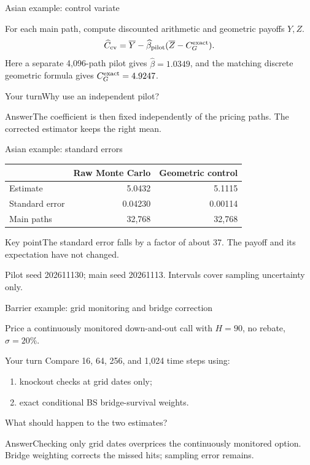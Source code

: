 \documentclass[handout,10pt,t,aspectratio=169]{beamer}
\newenvironment{pausebox}{\begin{block}{Your turn}}{\end{block}}
\newenvironment{answerbox}{\begin{exampleblock}{Answer}}{\end{exampleblock}}
\newenvironment{keybox}{\begin{exampleblock}{Key point}}{\end{exampleblock}}
\newcommand{\source}[1]{\vfill{\scriptsize\color{gray}#1\par}}
\begin{document}
\begin{frame}{Asian example: control variate}

    For each main path, compute discounted arithmetic and geometric payoffs \(Y,Z\).
    \[\widehat C_{\rm cv}=\overline Y-\widehat\beta_{\rm pilot}
      (\overline Z-C_G^{\rm exact}).\]
    Here a separate 4,096-path pilot gives \(\widehat\beta=1.0349\),
    and the matching discrete geometric formula gives \(C_G^{\rm exact}=4.9247\).
    \begin{pausebox}Why use an independent pilot?\end{pausebox}
    \begin{answerbox}The coefficient is then fixed independently of the pricing paths.
    The corrected estimator keeps the right mean.\end{answerbox}
\end{frame}
\begin{frame}{Asian example: standard errors}

    \begin{center}\begin{tabular}{lrr}
    \toprule & Raw Monte Carlo & Geometric control\\\midrule
    Estimate & 5.0432 & 5.1115\\[.5em]
    Standard error & 0.04230 & 0.00114\\[.5em]
    Main paths & 32,768 & 32,768\\\bottomrule\end{tabular}\end{center}
    \begin{keybox}The standard error falls by a factor of about
    37. The payoff and its expectation have not changed.
    \end{keybox}
    \source{Pilot seed 202611130; main seed 20261113. Intervals cover sampling uncertainty only.}
\end{frame}
\begin{frame}{Barrier example: grid monitoring and bridge correction}

    Price a continuously monitored down-and-out call with \(H=90\), no rebate,
    \(\sigma=20\%\).
    \begin{pausebox}
    Compare 16, 64, 256, and 1,024 time steps using:
    \begin{enumerate}
    \item knockout checks at grid dates only;
    \item exact conditional BS bridge-survival weights.
    \end{enumerate}
    What should happen to the two estimates?
    \end{pausebox}
    \begin{answerbox}Checking only grid dates overprices the continuously monitored option.
    Bridge weighting corrects the missed hits; sampling error remains.\end{answerbox}
\end{frame}
\end{document}
